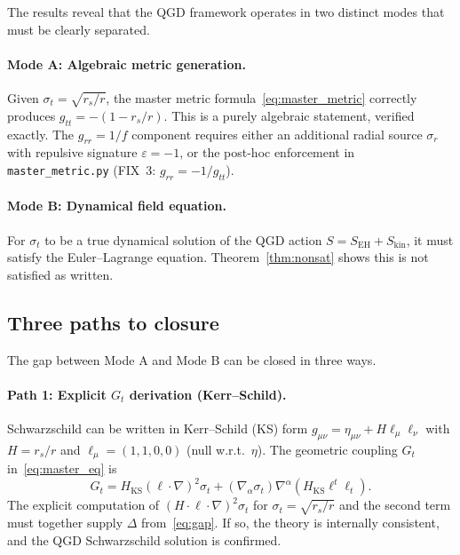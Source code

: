 \documentclass[11pt,a4paper]{article}
\theoremstyle{plain}
\theoremstyle{definition}
\newcommand{\sig}{\sigma}
\newcommand{\sigt}{\sigma_t}
\newcommand{\rs}{r_s}
\newcommand{\Skin}{S_{\mathrm{kin}}}
\newcommand{\SEH}{S_{\mathrm{EH}}}
\begin{document}
The results reveal that the QGD framework operates in two distinct
modes that must be clearly separated.

\paragraph{Mode A: Algebraic metric generation.}
Given $\sigt = \sqrt{\rs/r}$, the master metric formula~\eqref{eq:master_metric}
correctly produces $g_{tt} = -(1-\rs/r)$.  This is a purely algebraic
statement, verified exactly.  The $g_{rr}=1/f$ component requires
either an additional radial source $\sig_r$ with repulsive signature
$\varepsilon=-1$, or the post-hoc enforcement in \texttt{master\_metric.py}
(FIX~3: $g_{rr} = -1/g_{tt}$).

\paragraph{Mode B: Dynamical field equation.}
For $\sigt$ to be a true dynamical solution of the QGD action
$S = \SEH + \Skin$, it must satisfy the Euler--Lagrange equation.
Theorem~\ref{thm:nonsat} shows this is not satisfied as written.

\subsection{Three paths to closure}

The gap between Mode A and Mode B can be closed in three ways.

\paragraph{Path 1: Explicit $G_t$ derivation (Kerr--Schild).}
Schwarzschild can be written in Kerr--Schild (KS) form
$g_{\mu\nu} = \eta_{\mu\nu} + H\ell_\mu\ell_\nu$
with $H = \rs/r$ and $\ell_\mu = (1,1,0,0)$ (null w.r.t.\ $\eta$).
The geometric coupling $G_t$ in~\eqref{eq:master_eq} is
\begin{equation}\label{eq:Gt_KS}
  G_t = H_{\mathrm{KS}}(\ell\cdot\nabla)^2\sigt
      + (\nabla_\alpha\sigt)\nabla^\alpha(H_{\mathrm{KS}}\ell^t\ell_t).
\end{equation}
The explicit computation of $(H\cdot\ell\cdot\nabla)^2\sigt$ for
$\sigt = \sqrt{\rs/r}$ and the second term must together
supply $\Delta$ from~\eqref{eq:gap}.  If so, the theory is internally
consistent, and the QGD Schwarzschild solution is confirmed.
\end{document}
